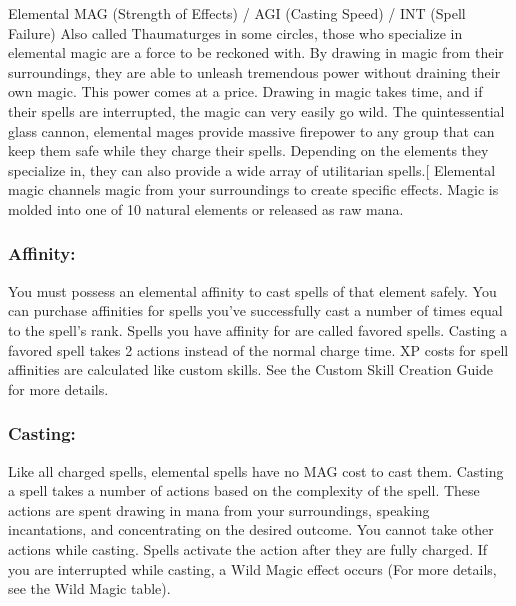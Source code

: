 ﻿\begin{pathele}
{Elemental}
{MAG (Strength of Effects) / AGI (Casting Speed) / INT (Spell Failure)}
{Also called Thaumaturges in some circles, those who specialize in elemental magic are a force to be reckoned with. By drawing in magic from their surroundings, they are able to unleash tremendous power without draining their own magic.
This power comes at a price. Drawing in magic takes time, and if their spells are interrupted, the magic can very easily go wild.}
{The quintessential glass cannon, elemental mages provide massive firepower to any group that can keep them safe while they charge their spells. Depending on the elements they specialize in, they can also provide a wide array of utilitarian spells.}[ 
Elemental magic channels magic from your surroundings to create specific effects. Magic is molded into one of 10 natural elements or released as raw mana.
\subsubsection{Affinity:}
	You must possess an elemental affinity to cast spells of that element safely. You can purchase affinities for spells you’ve successfully cast a number of times equal to the spell’s rank. Spells you have affinity for are called favored spells. Casting a favored spell takes 2 actions instead of the normal charge time.
	XP costs for spell affinities are calculated like custom skills. See the Custom Skill Creation Guide for more details.
\subsubsection{Casting:}
	Like all charged spells, elemental spells have no MAG cost to cast them. Casting a spell takes a number of actions based on the complexity of the spell. These actions are spent drawing in mana from your surroundings, speaking incantations, and concentrating on the desired outcome. You cannot take other actions while casting. Spells activate the action after they are fully charged.
	If you are interrupted while casting, a Wild Magic effect occurs (For more details, see the Wild Magic table).

\end{pathele}
